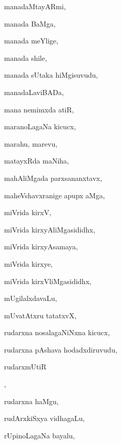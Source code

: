 \begin{multicols}{3}
{\noindent
{manadaMtayARmi}, \pageref{manadaMtayARmi}

\noindent
{manada BaMga}, \pageref{manada BaMga}

\noindent
{manada meYlige}, \pageref{manada meYlige}

\noindent
{manada shile}, \pageref{manada shile}

\noindent
{manada sUtaka hiMgisuvudu}, \pageref{manada sUtaka hiMgisuvudu}

\noindent
{manadaLaviBADa}, \pageref{manadaLaviBADa}

\noindent
{mana nemimxda atiR}, \pageref{mana nemimxda atiR}

\noindent
{maranoLagaNa kicucx}, \pageref{maranoLagaNa kicucx}

\noindent
{marahu, marevu}, \pageref{marahu, marevu}

\noindent
{matayxRda maNiha}, \pageref{matayxRda maNiha}

\noindent
{mahAliMgada parxsananxtavx}, \pageref{mahAliMgada parxsananxtavx}

\noindent
{maheVshavxranige apupx aMga}, \pageref{maheVshavxranige apupx aMga}

\noindent
{miVrida kirxV}, \pageref{miVrida kirxV}

\noindent
{miVrida kirxyAliMgasididhx}, \pageref{miVrida kirxyAliMgasididhx}

\noindent
{miVrida kirxyAsamaya}, \pageref{miVrida kirxyAsamaya}

\noindent
{miVrida kirxye}, \pageref{miVrida kirxye}

\noindent
{miVrida kirxVliMgasididhx}, \pageref{miVrida kirxVliMgasididhx}

\noindent
{mUgilalxdavaLu}, \pageref{mUgilalxdavaLu}

\noindent
{mUvatAtxru tatatxvX}, \pageref{mUvatAtxru tatatxvX}

\noindent
{rudarxna nosalagaNiNxna kicucx}, \pageref{rudarxna nosalagaNiNxna kicucx}

\noindent
{rudarxna pAshava hodadxdiruvudu}, \pageref{rudarxna pAshava hodadxdiruvudu}

\noindent
{rudarxmUtiR}

\noindent
{}, \pageref{rudarxmUtiR jaMgamavAguvudu}

\noindent
{rudarxna haMgu}, \pageref{rudarxna haMgu}

\noindent
{rudArxkiSxya vidhagaLu}, \pageref{rudArxkiSxya vidhagaLu}

\noindent
{rUpinoLagaNa bayalu}, \pageref{rUpinoLagaNa bayalu}

}
\end{multicols}
